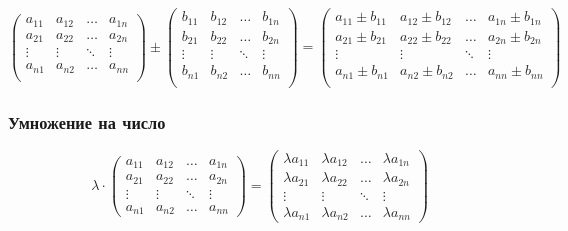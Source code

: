 \documentclass[class=article,a4paper,12pt,crop=false]{standalone}
\begin{document}
\begin{equation}
    \begin{pmatrix}
        a_{11} & a_{12} & \dots & a_{1n} \\
        a_{21} & a_{22} & \dots & a_{2n} \\
        \vdots & \vdots & \ddots & \vdots \\
        a_{n1} & a_{n2} & \dots & a_{nn} \\
    \end{pmatrix} \pm \begin{pmatrix}
        b_{11} & b_{12} & \dots & b_{1n} \\
        b_{21} & b_{22} & \dots & b_{2n} \\
        \vdots & \vdots & \ddots & \vdots \\
        b_{n1} & b_{n2} & \dots & b_{nn} \\
    \end{pmatrix} = \begin{pmatrix}
        a_{11} \pm b_{11} & a_{12} \pm b_{12} & \dots & a_{1n} \pm b_{1n} \\
        a_{21} \pm b_{21} & a_{22} \pm b_{22} & \dots & a_{2n} \pm b_{2n} \\
        \vdots & \vdots & \ddots & \vdots \\
        a_{n1} \pm b_{n1} & a_{n2} \pm b_{n2} & \dots & a_{nn} \pm b_{nn} \\
    \end{pmatrix}
\end{equation}

\subsubsection{Умножение на число}

\begin{equation}
    \lambda \cdot \begin{pmatrix}
        a_{11} & a_{12} & \dots & a_{1n} \\
        a_{21} & a_{22} & \dots & a_{2n} \\
        \vdots & \vdots & \ddots & \vdots \\
        a_{n1} & a_{n2} & \dots & a_{nn}
    \end{pmatrix} = \begin{pmatrix}
        \lambda a_{11} & \lambda a_{12} & \dots & \lambda a_{1n} \\
        \lambda a_{21} & \lambda a_{22} & \dots & \lambda a_{2n} \\
        \vdots & \vdots & \ddots & \vdots \\
        \lambda a_{n1} & \lambda a_{n2} & \dots & \lambda a_{nn}
    \end{pmatrix}
\end{equation}
\end{document}
